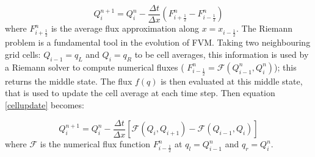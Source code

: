 \documentclass[10pt,a4paper]{article}
\begin{document}
	\begin{equation}
		Q_{i}^{n+1} = Q_{i}^{n} - \frac{\Delta t}{\Delta x} (F_{i+\frac{1}{2}}^{n} - F_{i-\frac{1}{2}}^{n})
		\label{cellupdate}
	\end{equation}	
	where $F_{i+\frac{1}{2}}^{n} $ is the average flux approximation along $x=x_{i-\frac{1}{2}}$.
	The Riemann problem is a fundamental tool in the evolution of FVM. Taking two neighbouring grid cells: $Q_{i-1} = q_{L}$ and $Q_{i} = q_{R}$ to be cell averages, this information is used by a Riemann solver to compute numerical fluxes ( $F_{i-\frac{1}{2}}^{n} = \mathcal{F}(Q_{i-1}^{n} , Q_{i}^{n} )$); this returns the middle state.  The flux $f(q)$ is then evaluated at this middle state, that is used to update the cell average at each time step. Then equation \eqref{cellupdate} becomes:
	
	\begin{equation}
		Q_{i}^{n+1} = Q_{i}^{n} - \frac{\Delta t}{\Delta x} \left[ \mathcal{F}(Q_{i} , Q_{i+1} ) - \mathcal{F}(Q_{i-1} , Q_{i} ) \right]
		\label{cellupdat}
	\end{equation}
	where $\mathcal{F}$ is the  numerical flux function $F_{i-\frac{1}{2}}^{n}$ at $q_l = Q_{i-1}^{n}$  and $q_r = Q_{i}^{n}$.
	
\end{document}

